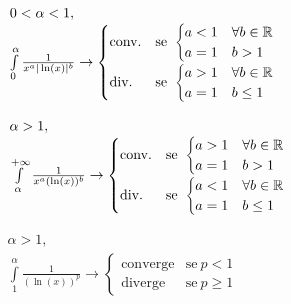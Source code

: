 $ \begin{array}{l}
0< \alpha < 1,\\
\int\limits^{\alpha}_0\frac{1}{x^a| \ln( x)|^b}\rightarrow \begin{cases}
\text{conv.} & \text{se} \ \begin{cases}
a< 1 & \forall b\in \mathbb R\\
a=1 & b >1
\end{cases}\\
\text{div.} & \text{se} \ \begin{cases}
a >1 & \forall b\in \mathbb R\\
a=1 & b\leq 1
\end{cases}
\end{cases}
\end{array}$

$ \begin{array}{l}
\alpha >1,\\
\int\limits^{+\infty}_{\alpha}\frac{1}{x^a(\ln( x))^b}\rightarrow \begin{cases}
\text{conv.} & \text{se} \ \begin{cases}
a >1 & \forall b\in \mathbb R\\
a=1 & b >1
\end{cases}\\
\text{div.} & \text{se} \ \begin{cases}
a< 1 & \forall b\in \mathbb R\\
a=1 & b\leq 1
\end{cases}
\end{cases}
\end{array}$

$ \begin{array}{l}
\alpha >1,\\
\int\limits^{\alpha}_1\frac{1}{(\ln( x))^p}\rightarrow \begin{cases}
\text{converge} & \text{se} \ p< 1\\
\text{diverge} & \text{se} \ p\geq 1
\end{cases}
\end{array}$